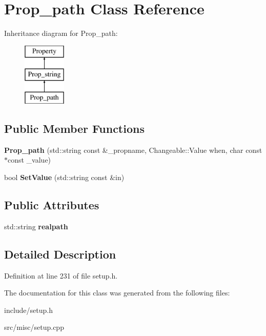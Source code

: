 \hypertarget{classProp__path}{\section{Prop\-\_\-path Class Reference}
\label{classProp__path}
}
Inheritance diagram for Prop\-\_\-path\-:\begin{figure}[H]
\begin{center}
\leavevmode
\includegraphics[height=3.000000cm]{classProp__path}
\end{center}
\end{figure}
\subsection*{Public Member Functions}
\begin{DoxyCompactItemize}
\item 
\hypertarget{classProp__path_a913eabbbfd399fed38f39381946e2eba}{{\bfseries Prop\-\_\-path} (std\-::string const \&\-\_\-propname, Changeable\-::\-Value when, char const $\ast$const \-\_\-value)}\label{classProp__path_a913eabbbfd399fed38f39381946e2eba}

\item 
\hypertarget{classProp__path_a0ba43ea1b4d1be0feb1ee6aa13428ed4}{bool {\bfseries Set\-Value} (std\-::string const \&in)}\label{classProp__path_a0ba43ea1b4d1be0feb1ee6aa13428ed4}

\end{DoxyCompactItemize}
\subsection*{Public Attributes}
\begin{DoxyCompactItemize}
\item 
\hypertarget{classProp__path_aa4281b80a9ba382027add3a82eecd7c3}{std\-::string {\bfseries realpath}}\label{classProp__path_aa4281b80a9ba382027add3a82eecd7c3}

\end{DoxyCompactItemize}


\subsection{Detailed Description}


Definition at line 231 of file setup.\-h.



The documentation for this class was generated from the following files\-:\begin{DoxyCompactItemize}
\item 
include/setup.\-h\item 
src/misc/setup.\-cpp\end{DoxyCompactItemize}
